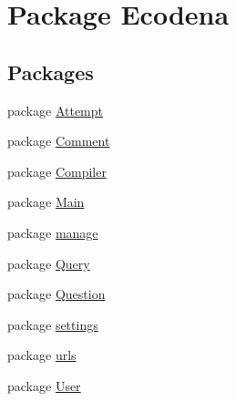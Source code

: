 \hypertarget{namespace_ecodena}{
\section{Package Ecodena}
\label{d8/d35/namespace_ecodena}
}
\subsection*{Packages}
\begin{DoxyCompactItemize}
\item 
package \hyperlink{namespace_ecodena_1_1_attempt}{Attempt}
\item 
package \hyperlink{namespace_ecodena_1_1_comment}{Comment}
\item 
package \hyperlink{namespace_ecodena_1_1_compiler}{Compiler}
\item 
package \hyperlink{namespace_ecodena_1_1_main}{Main}
\item 
package \hyperlink{namespace_ecodena_1_1manage}{manage}
\item 
package \hyperlink{namespace_ecodena_1_1_query}{Query}
\item 
package \hyperlink{namespace_ecodena_1_1_question}{Question}
\item 
package \hyperlink{namespace_ecodena_1_1settings}{settings}
\item 
package \hyperlink{namespace_ecodena_1_1urls}{urls}
\item 
package \hyperlink{namespace_ecodena_1_1_user}{User}
\end{DoxyCompactItemize}
